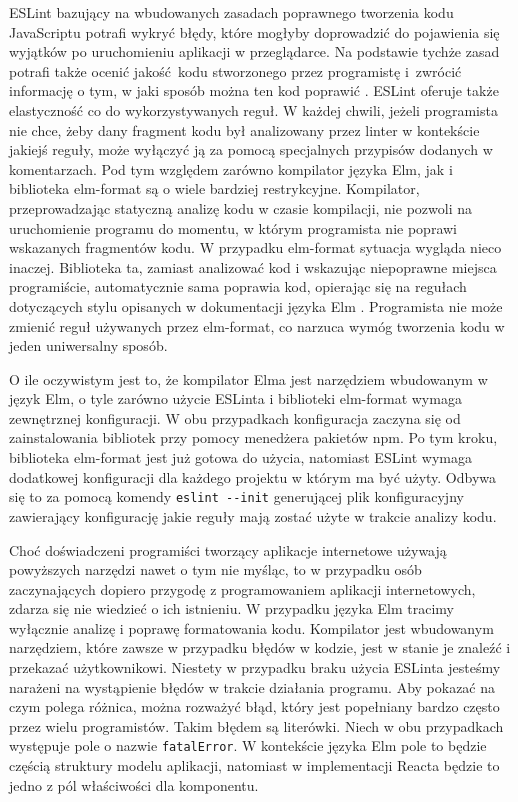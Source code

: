 ESLint bazujący na wbudowanych zasadach poprawnego tworzenia kodu JavaScriptu potrafi wykryć błędy, które mogłyby doprowadzić do pojawienia się wyjątków po uruchomieniu aplikacji w przeglądarce. Na podstawie tychże zasad potrafi także ocenić jakość kodu stworzonego przez programistę i~zwrócić informację o tym, w jaki sposób można ten kod poprawić \cite{ESLint}. ESLint oferuje także elastyczność co do wykorzystywanych reguł. W każdej chwili, jeżeli programista nie chce, żeby dany fragment kodu był analizowany przez linter w kontekście jakiejś reguły, może wyłączyć ją za pomocą specjalnych przypisów dodanych w komentarzach. Pod tym względem zarówno kompilator języka Elm, jak i biblioteka elm-format są o wiele bardziej restrykcyjne. Kompilator, przeprowadzając statyczną analizę kodu w czasie kompilacji, nie pozwoli na uruchomienie programu do momentu, w którym programista nie poprawi wskazanych fragmentów kodu. W przypadku elm-format sytuacja wygląda nieco inaczej. Biblioteka ta, zamiast analizować kod i wskazując niepoprawne miejsca programiście, automatycznie sama poprawia kod, opierając się na regułach dotyczących stylu opisanych w dokumentacji języka Elm \cite{elmStyleGuide}. Programista nie może zmienić reguł używanych przez elm-format, co narzuca wymóg tworzenia kodu w jeden uniwersalny sposób.

O ile oczywistym jest to, że kompilator Elma jest narzędziem wbudowanym w język Elm, o tyle zarówno użycie ESLinta i biblioteki elm-format wymaga zewnętrznej konfiguracji. W obu przypadkach konfiguracja zaczyna się od zainstalowania bibliotek przy pomocy menedżera pakietów npm. Po tym kroku, biblioteka elm-format jest już gotowa do użycia, natomiast ESLint wymaga dodatkowej konfiguracji dla każdego projektu w którym ma być użyty. Odbywa się to za pomocą komendy \lstinline{eslint --init} generującej plik konfiguracyjny zawierający konfigurację jakie reguły mają zostać użyte w trakcie analizy kodu.

Choć doświadczeni programiści tworzący aplikacje internetowe używają powyższych narzędzi nawet o tym nie myśląc, to w przypadku osób zaczynających dopiero przygodę z programowaniem aplikacji internetowych, zdarza się nie wiedzieć o ich istnieniu. W przypadku języka Elm tracimy wyłącznie analizę i poprawę formatowania kodu. Kompilator jest wbudowanym narzędziem, które zawsze w przypadku błędów w kodzie, jest w stanie je znaleźć i przekazać użytkownikowi. Niestety w przypadku braku użycia ESLinta jesteśmy narażeni na wystąpienie błędów w trakcie działania programu. Aby pokazać na czym polega różnica, można rozważyć błąd, który jest popełniany bardzo często przez wielu programistów. Takim błędem są literówki. Niech w obu przypadkach występuje pole o nazwie \lstinline{fatalError}. W kontekście języka Elm pole to będzie częścią struktury modelu aplikacji, natomiast w implementacji Reacta będzie to jedno z pól właściwości dla komponentu.

